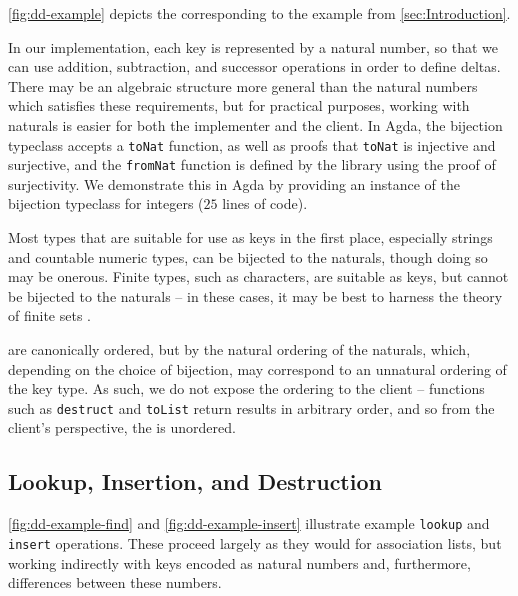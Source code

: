 \autoref{fig:dd-example} depicts the \dd{} corresponding to the example from \autoref{sec:Introduction}.


In our implementation, each key is represented by a natural number, so that we can use addition, subtraction, and successor operations in order to define deltas.
%
There may be an algebraic structure more general than the natural numbers which satisfies these requirements, but for practical purposes, working with naturals
%
is easier for both the implementer and the client. In Agda, the bijection typeclass accepts a \texttt{toNat} function, as well as proofs that \texttt{toNat}
%
is injective and surjective, and the \texttt{fromNat} function is defined by the library using the proof of surjectivity. We demonstrate this in Agda by
%
providing an instance of the bijection typeclass for integers ($25$ lines of code).

Most types that are suitable for use as keys in the first place, especially strings and countable numeric types, can be bijected to the naturals,
%
though doing so may be onerous. Finite types, such as characters, are suitable as keys, but cannot be bijected to the naturals -- in these cases,
%
it may be best to harness the theory of finite sets \citep{FinSets}.

\Ddls{} are canonically ordered, but by the natural ordering of the naturals, which, depending on the choice of bijection, may correspond to an unnatural
%
ordering of the key type. As such, we do not expose the ordering to the client -- functions such as \texttt{destruct} and \texttt{toList} return results
%
in arbitrary order, and so from the client's perspective, the \dd{} is unordered.

\subsection{Lookup, Insertion, and Destruction}
\label{sec:DD:basics}



\autoref{fig:dd-example-find} and \autoref{fig:dd-example-insert} illustrate example \texttt{lookup} and \texttt{insert} operations.
%
These proceed largely as they would for association lists, but working indirectly with keys encoded as natural numbers and, furthermore, differences between these numbers.

